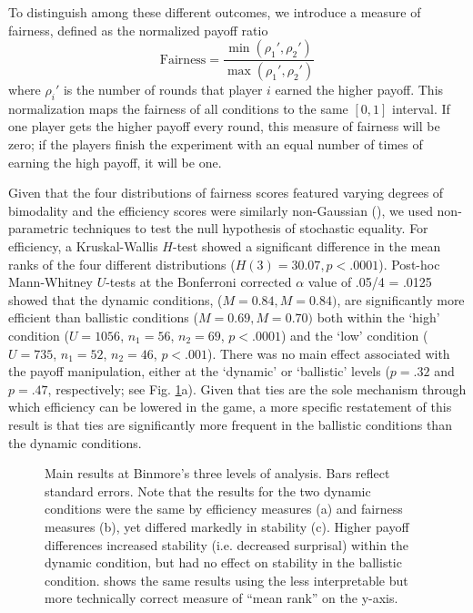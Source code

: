 \documentclass[10pt,letterpaper]{article}
\begin{document}
To distinguish among these different outcomes, we introduce a measure of fairness, defined as the normalized payoff ratio $$\text{Fairness} = \frac{\min(\rho_1', \rho_2')}{\max(\rho_1', \rho_2')}$$ where $\rho_i'$ is the number of rounds that player $i$ earned the higher payoff. This normalization maps the fairness of all conditions to the same $[0,1]$ interval. If one player gets the higher payoff every round, this measure of fairness will be zero; if the players finish the experiment with an equal number of times of earning the high payoff, it will be one. 

Given that the four distributions of fairness scores featured varying degrees of bimodality and the efficiency scores were similarly non-Gaussian (), we used non-parametric techniques to test the null hypothesis of stochastic equality. For efficiency, a Kruskal-Wallis $H$-test showed a significant difference in the mean ranks of the four different distributions ($H(3) = 30.07, p < .0001$). Post-hoc Mann-Whitney $U$-tests at the Bonferroni corrected $\alpha$ value of .05/4 = .0125 showed that the dynamic conditions, ($M = 0.84, M = 0.84)$, are significantly more efficient than ballistic conditions ($M = 0.69, M = 0.70)$ both within the `high' condition ($U = 1056$, $n_1 = 56$, $n_2 = 69$, $p < .0001$) and the `low' condition ($U = 735$, $n_1 = 52$, $n_2 = 46$, $p < .001$). There was no main effect associated with the payoff manipulation, either at the `dynamic' or `ballistic' levels ($p = .32$ and $p = .47$, respectively; see Fig. \ref{Fig2}a). Given that ties are the sole mechanism through which efficiency can be lowered in the game, a more specific restatement of this result is that ties are significantly more frequent in the ballistic conditions than the dynamic conditions.

\begin{figure}[t]
\centering
\caption{Main results at Binmore's three levels of analysis. Bars reflect standard errors. Note that the results for the two dynamic conditions were the same by efficiency measures (a) and fairness measures (b), yet differed markedly in stability (c). Higher payoff differences increased stability (i.e. decreased surprisal) within the dynamic condition, but had no effect on stability in the ballistic condition.  shows the same results using the less interpretable but more technically correct measure of ``mean rank'' on the y-axis.}
\label{Fig2}
\end{figure}
\end{document}
